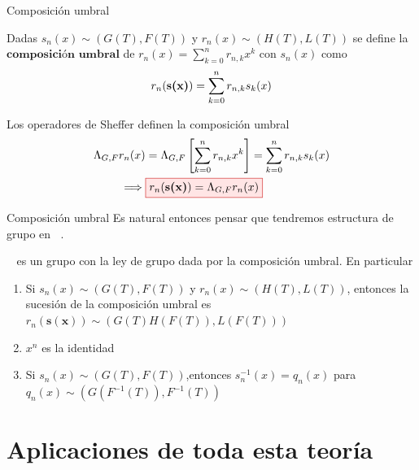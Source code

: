 \documentclass{beamer}
\newenvironment{teorema}[1][]{
  \begin{tcolorbox}[colback=darkred!10, colframe=darkred!90, title=Teorema\ #1, fonttitle=\bfseries]
}{
  \end{tcolorbox}
}
\newenvironment{definicion}[1][]{
  \begin{tcolorbox}[colback=red!10, colframe=red!80!black, title=Definición\ #1, fonttitle=\bfseries]
}{
  \end{tcolorbox}
}
\newcommand{\rboxed}[1]{%
  \fcolorbox{red!80!black}{red!10}{$#1$}%
}
\DeclareMathOperator*{\Sh}{Sh(\mathbb{P})} %
\begin{document}
\begin{frame}{Composición umbral}
  \begin{definicion}
    Dadas $s_n(x) \sim (G(T), F(T))$ y $r_n(x) \sim (H(T), L(T))$ se define la $\textbf{composición umbral}$ de $r_n(x) = \displaystyle \sum_{k=0}^n r_{n,k}x^k$ con $s_n(x)$ como
    \begin{equation*}
        r_n(\mbox{\bfseries s(x)}) = \sum_{k=0}^n r_{n,k}s_k(x)
    \end{equation*} 
\end{definicion}
Los operadores de Sheffer definen la composición umbral
  \begin{align*}
    \Lambda_{G,F}r_n(x) & = \Lambda_{G,F} \left[\sum_{k=0}^n r_{n,k}x^k \right] = \sum_{k=0}^n r_{n,k}s_k(x)\\
    \implies & \rboxed{r_n(\mbox{\bfseries s(x)}) = \Lambda_{G,F}r_n(x)}
  \end{align*}
\end{frame}

\begin{frame}{Composición umbral}
  Es natural entonces pensar que tendremos estructura de grupo en $\Sh$.
  \begin{teorema}
    $\Sh$ es un grupo con la ley de grupo dada por la composición umbral. En particular
    \begin{enumerate}
        \item Si $s_n(x) \sim (G(T), F(T))$ y  $r_n(x) \sim (H(T), L(T))$, entonces la sucesión de la composición umbral es $r_n(\mathbf{s(x)}) \sim (G(T)H(F(T)), L(F(T)))$ 
        \item $x^n$ es la identidad 
        \item Si $s_n(x) \sim (G(T), F(T))$,entonces $s_n^{-1}(x) = q_n(x)$ para $q_n(x) \sim (G(F^{-1}(T)), F^{-1}(T))$
    \end{enumerate}
  \end{teorema}
\end{frame}
  
\section{Aplicaciones de toda esta teoría}
\end{document}
